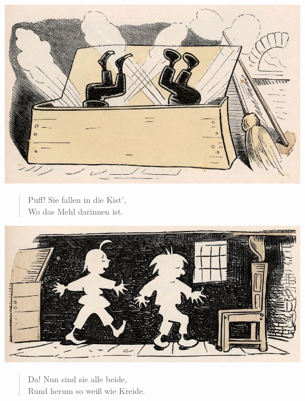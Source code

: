 \documentclass[a4paper,12pt]{article}
\begin{document}
\begin{center}\includegraphics[scale=.7, alt={... in die Mehlkist'}]{images/6-04.jpg}\end{center}



\begin{verse}
Puff! Sie fallen in die Kist',\\{}
Wo das Mehl darinnen ist.
\end{verse}



\begin{center}\includegraphics[scale=.7, alt={Weiß wie Kreide}]{images/6-05.jpg}\end{center}



\begin{verse}
Da! Nun sind sie alle beide,\\{}
Rund herum so weiß wie Kreide.
\end{verse}
\end{document}
